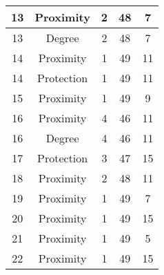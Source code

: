 \documentclass[results.tex]{subfiles}
\begin{document}
\begin{center}
\begin{tabular}{| c || c | c | c | c |}
            \hline
            13                      & Proximity                    & 2                      & 48                      & 7                    \\
            \hline
            13                      & Degree                       & 2                      & 48                      & 7                    \\
            \hline
            14                      & Proximity                    & 1                      & 49                      & 11                   \\
            \hline
            14                      & Protection                   & 1                      & 49                      & 11                   \\
            \hline
            15                      & Proximity                    & 1                      & 49                      & 9                    \\
            \hline
            16                      & Proximity                    & 4                      & 46                      & 11                   \\
            \hline
            16                      & Degree                       & 4                      & 46                      & 11                   \\
            \hline
            17                      & Protection                   & 3                      & 47                      & 15                   \\
            \hline
            18                      & Proximity                    & 2                      & 48                      & 11                   \\
            \hline
            19                      & Proximity                    & 1                      & 49                      & 7                    \\
            \hline
            20                      & Proximity                    & 1                      & 49                      & 15                   \\
            \hline
            21                      & Proximity                    & 1                      & 49                      & 5                    \\
            \hline
            22                      & Proximity                    & 1                      & 49                      & 15                   \\

\end{tabular}
\end{center}
\end{document}
